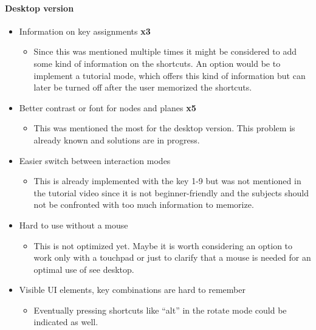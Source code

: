 \paragraph{Desktop version}
\begin{itemize}
  \item Information on key assignments \textbf{x3}
  \begin{itemize}
    \item Since this was mentioned multiple times it might be considered to add some kind of information on the \glspl{shortcut}. An option would be to implement a tutorial mode, which offers this kind of information but can later be turned off after the user memorized the \glspl{shortcut}.
  \end{itemize}
  \item Better contrast or font for nodes and planes \textbf{x5}
  \begin{itemize}
    \item This was mentioned the most for the desktop version. This problem is already known and solutions are in progress. 
  \end{itemize}
  \item Easier switch between interaction modes
  \begin{itemize}
    \item This is already implemented with the key 1-9 but was not mentioned in the tutorial video since it is not beginner-friendly and the subjects should not be confronted with too much information to memorize.
  \end{itemize}
  \item Hard to use without a mouse
  \begin{itemize}
    \item This is not optimized yet. Maybe it is worth considering an option to work only with a touchpad or just to clarify that a mouse is needed for an optimal use of \gls{see} desktop.
  \end{itemize}
  \item Visible UI elements, key combinations are hard to remember
  \begin{itemize}
    \item Eventually pressing \glspl{shortcut} like \enquote{alt} in the rotate mode could be indicated as well. 
  \end{itemize}
\end{itemize} 
